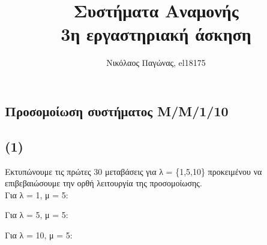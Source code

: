 \documentclass[a4paper]{article}
\title{Συστήματα Αναμονής \\ 3η εργαστηριακή άσκηση}
\author{Νικόλαος Παγώνας, el18175}
\date{}
\begin{document}
\maketitle

\subsection*{Προσομοίωση συστήματος Μ/Μ/1/10}

\subsection*{(1)}

\begin{minipage}{\textwidth}

Εκτυπώνουμε τις πρώτες 30 μεταβάσεις για λ = \{1,5,10\} προκειμένου να επιβεβαιώσουμε την ορθή λειτουργία της προσομοίωσης.\\

Για λ = 1, μ = 5:
\small

\normalsize
\end{minipage}

\begin{minipage}{\textwidth}
Για λ = 5, μ = 5:
\small

\normalsize
\end{minipage}


\begin{minipage}{\textwidth}
Για λ = 10, μ = 5:
\small

\normalsize
\end{minipage}
\end{document}
